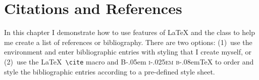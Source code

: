 
\def\BibTeX{{\rmfamily B\kern-.05em%
   \textsc{i\kern-.025em b}\kern-.08em\TeX}}


\newenvironment{narrowref}{
  \begin{singlespaced}
  \frenchspacing
  \setlength{\leftskip}{4em}
  \setlength{\rightskip}{3em}
  \setlength{\parindent}{-2em}
  \addvspace{0.5\baselineskip}
  \leavevmode
  \setlength{\parskip}{0.6\baselineskip}\ignorespaces}
 {\end{singlespaced}\addvspace{.5\baselineskip}}


\chapter{Citations and References}
In this chapter I demonstrate how to use features of \LaTeX{} and
the  class to help me create a list of references or
bibliography.  There are two options: (1)~use the 
environment and enter bibliographic entries with styling 
that I create myself, or (2)~use the \LaTeX\ \verb|\cite| macro
and \BibTeX{} to order and style the bibliographic entries according
to a pre-defined style sheet.

